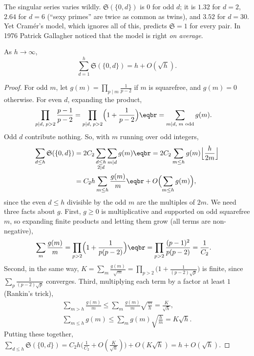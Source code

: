 The singular series varies wildly. $\mathfrak S(\{0,d\})$ is $0$ for odd $d$; it is $1.32$ for $d=2$, $2.64$ for $d=6$ (``sexy primes'' are twice as common as twins), and $3.52$ for $d=30$. Yet Cramér's model, which
ignores all of this, predicts $\mathfrak S=1$ for every pair. In 1976 Patrick Gallagher noticed that the model is right \emph{on average}.

\begin{theorem}[Gallagher, 1976]\label{thm:gallagher}
As $h\to\infty$,
\[
\sum_{d=1}^h\mathfrak S(\{0,d\})=h+O(\sqrt h).
\]
\end{theorem}

\begin{proof}
For odd $m$, let $g(m)=\prod_{p\mid m}\frac1{p-2}$ if $m$ is squarefree, and $g(m)=0$ otherwise. For even $d$, expanding the product,
\[
\begin{aligned}\prod_{p\mid d,\;p>2}\frac{p-1}{p-2}&=\prod_{p\mid d,\;p>2}\Bigl(1+\frac1{p-2}\Bigr)\eqbr=\sum_{m\mid d,\;m\text{ odd}}g(m).\end{aligned}
\]
Odd $d$ contribute nothing. So, with $m$ running over odd integers,
\[
\begin{aligned}\sum_{d\le h}\mathfrak S(\{0,d\})&=2C_2\sum_{\substack{d\le h\\2\mid d}}\sum_{m\mid d}g(m)\eqbr=2C_2\sum_{m\le h}g(m)\Bigl\lfloor\frac h{2m}\Bigr\rfloor\\&=C_2h\sum_{m\le h}\frac{g(m)}m\eqbr+O\Bigl(\sum_{m\le h}g(m)\Bigr),\end{aligned}
\]
since the even $d\le h$ divisible by the odd $m$ are the multiples of $2m$. We need three facts about $g$. First, $g\ge0$ is multiplicative and supported on odd squarefree $m$, so expanding finite products and letting
them grow (all terms are non-negative),
\[
\begin{aligned}\sum_m\frac{g(m)}m&=\prod_{p>2}\Bigl(1+\frac1{p(p-2)}\Bigr)\eqbr=\prod_{p>2}\frac{(p-1)^2}{p(p-2)}=\frac1{C_2}.\end{aligned}
\]
Second, in the same way, $K=\sum_m\frac{g(m)}{\sqrt m}=\prod_{p>2}\bigl(1+\frac1{(p-2)\sqrt p}\bigr)$ is finite, since $\sum_p\frac1{(p-2)\sqrt p}$ converges. Third, multiplying each term by a factor at least $1$ (Rankin's trick),
\[
\begin{gathered}\sum_{m>h}\frac{g(m)}m\le\sum_m\frac{g(m)}m\sqrt{\frac mh}=\frac K{\sqrt h},\\\sum_{m\le h}g(m)\le\sum_mg(m)\sqrt{\frac hm}=K\sqrt h.\end{gathered}
\]
Putting these together, $\sum_{d\le h}\mathfrak S(\{0,d\})=C_2h\bigl(\frac1{C_2}+O(\frac K{\sqrt h})\bigr)+O(K\sqrt h)=h+O(\sqrt h)$.
\end{proof}

